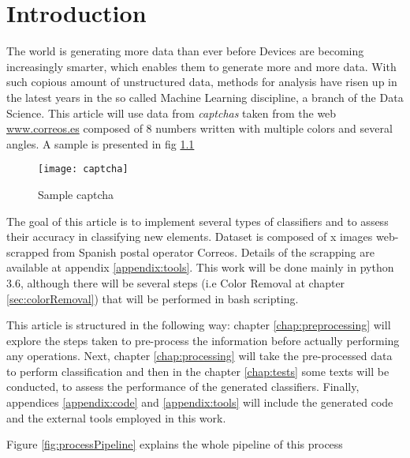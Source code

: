 \chapter{Introduction}
The world is generating more data than ever before\cite{forbesDataScience} Devices are becoming increasingly smarter, which enables them to generate more and more data. With such copious amount of unstructured data, methods for analysis have risen up in the latest years in the so called Machine Learning discipline, a branch of the Data Science. This article will use data from \textit{captchas} taken from the web \url{www.correos.es} composed of 8 numbers written with multiple colors and several angles. A sample is presented in fig \ref{fig:sampleCaptcha}\medskip
\begin{figure}[h]
    \centering
    \texttt{[image: captcha]}
    \caption{Sample captcha}
    \label{fig:sampleCaptcha}
\end{figure}

 

The goal of this article is to implement several types of classifiers and to assess their accuracy in classifying new elements. Dataset is composed of x images web-scrapped from Spanish postal operator Correos. Details of the scrapping are available at appendix \ref{appendix:tools}. This work will be done mainly in python 3.6, although there will be several steps (i.e Color Removal at chapter \ref{sec:colorRemoval}) that will be performed in bash scripting.\medskip

This article is structured in the following way: chapter \ref{chap:preprocessing} will explore the steps taken to pre-process the information before actually performing any operations. Next, chapter \ref{chap:processing} will take the pre-processed data to perform classification and then in the chapter \ref{chap:tests} some texts will be conducted, to assess the performance of the generated classifiers. Finally, appendices \ref{appendix:code} and \ref{appendix:tools} will include the generated code and the external tools employed in this work.\medskip

Figure \ref{fig:processPipeline} explains the whole pipeline of this process

